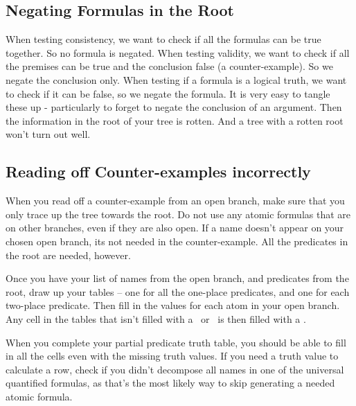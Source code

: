 \documentclass[PHIL101-Textbook.tex]{subfiles}
\begin{document}
\subsection{Negating Formulas in the Root}
When testing consistency, we want to check if all the formulas can be true together. So no formula is negated. When testing validity, we want to check if all the premises can be true and the conclusion false (a counter-example). So we negate the conclusion only. When testing if a formula is a logical truth, we want to check if it can be false, so we negate the formula. It is very easy to tangle these up - particularly to forget to negate the conclusion of an argument. Then the information in the root of your tree is rotten. And a tree with a rotten root won't turn out well.


\subsection{Reading off Counter-examples incorrectly}

When you read off a counter-example from an open branch, make sure that you only trace up the tree towards the root. Do not use any atomic formulas that are on other branches, even if they are also open. If a name doesn't appear on your chosen open branch, its not needed in the counter-example. All the predicates in the root are needed, however.


Once you have your list of names from the open branch, and predicates from the root, draw up your tables -- one for all the one-place predicates, and one for each two-place predicate. Then fill in the values for each atom in your open branch. Any cell in the tables that isn't filled with a \vT\ or \vF\ is then filled with a \vU.

When you complete your partial predicate truth table, you should be able to fill in all the cells even with the missing truth values. If you need a truth value to calculate a row, check if you didn't decompose all names in one of the universal quantified formulas, as that's the most likely way to skip generating a needed atomic formula.




%
%
%
\end{document}
